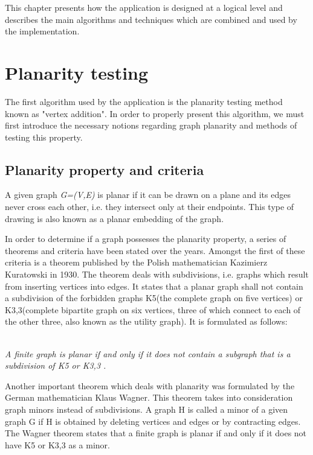 This chapter presents how the application is designed at a logical level and describes the 
main algorithms and techniques which are combined and used by the implementation.

\section{Planarity testing}

The first algorithm used by the application is the planarity testing method known as "vertex addition". In 
order to properly present this algorithm, we must first introduce the necessary notions regarding graph planarity 
and methods of testing this property.

\subsection{Planarity property and criteria}

A given graph \emph{G=(V,E)} is planar if it can be drawn on a plane and its edges never cross each other, i.e. they 
intersect only at their endpoints. This type of drawing is also known as a planar embedding of the graph.

In order to determine if a graph possesses the planarity property, a series of theorems and criteria have been 
stated over the years. Amongst the first of these criteria is a theorem published by the Polish mathematician 
Kazimierz Kuratowski in 1930. The theorem deals with subdivisions, i.e. graphs which result from inserting vertices 
into edges. It states that a planar graph shall not contain a subdivision of the forbidden graphs K5(the complete 
graph on five vertices) or K3,3(complete bipartite graph on six vertices, three of which connect to each of the other 
three, also known as the utility graph). It is formulated as follows:

\\ \textit{
A finite graph is planar if and only if it does not contain a subgraph that is a subdivision of K5 or K3,3 .
}

Another important theorem which deals with planarity was formulated by the German mathematician Klaus Wagner. 
This theorem takes into consideration graph minors instead of subdivisions. A graph H is called a minor of a given 
graph G if H is obtained by deleting vertices and edges or by contracting edges. The Wagner theorem states that 
a finite graph is planar if and only if it does not have K5 or K3,3 as a minor.

